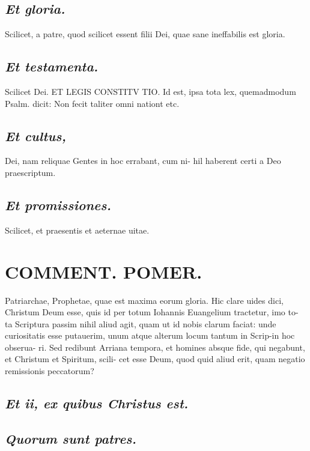 \documentclass{article}
\begin{document}
\begin{pages}
\subsection*{\textit{Et gloria. }}\pstart Scilicet, a patre, quod scilicet essent filii Dei, quae sane ineffabilis est gloria.   \pend
{}
{}
\subsection*{\textit{Et testamenta. }}\pstart Scilicet Dei. ET LEGIS CONSTITV TIO. Id est, ipsa tota lex, quemadmodum Psalm.  dicit: Non fecit taliter omni nationt etc.   \pend
{}
{}
\subsection*{\textit{Et cultus, }}\pstart Dei, nam reliquae Gentes in hoc errabant, cum ni- hil haberent certi a Deo praescriptum.   \pend
{}
{}
\subsection*{\textit{Et promissiones. }}\pstart Scilicet, et praesentis et aeternae uitae.   \pend
\section*{COMMENT. POMER.  }\pstart Patriarchae, Prophetae, quae est maxima eorum gloria.   \pend\pstart Hic clare uides dici, Christum Deum esse, quis id per totum Iohannis Euangelium tractetur, imo to- ta Scriptura passim nihil aliud agit, quam ut id nobis clarum faciat: unde curiositatis esse putauerim, unum atque alterum locum tantum in Scrip-in hoc obserua- ri. Sed redibunt Arriana tempora, et homines absque  fide, qui negabunt, et Christum et Spiritum, scili- cet esse Deum, quod quid aliud erit, quam negatio remissionis peccatorum?  \pend
{}
{}
\subsection*{\textit{Et ii, ex quibus Christus est. }}
{}
\subsection*{\textit{Quorum sunt patres. }}
{}

\end{pages}
\end{document}
